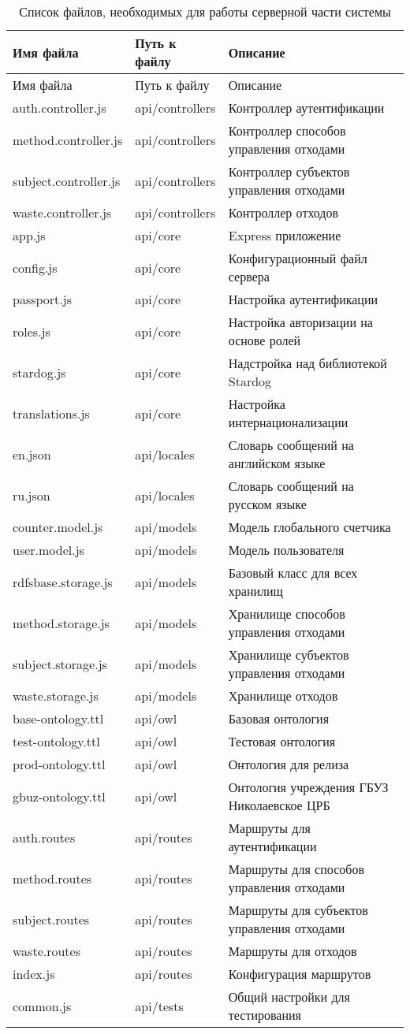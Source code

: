\documentclass[a4paper]{G2-105}
\begin{document}
\begin{longtable}[l]{|p{5cm}|p{3cm}|p{6.7cm}|}
\caption{Список файлов, необходимых для работы серверной части системы}
\label{tab:source_files_server}\tabularnewline
\hline
Имя файла & Путь к файлу & Описание \tabularnewline
\endfirsthead
\hline
Имя файла & Путь к файлу & Описание \tabularnewline
\endhead
\hline
auth.controller.js & api/controllers & Контроллер аутентификации \tabularnewline
\hline
method.controller.js & api/controllers & Контроллер способов управления отходами \tabularnewline
\hline
subject.controller.js & api/controllers & Контроллер субъектов управления отходами \tabularnewline
\hline
waste.controller.js & api/controllers & Контроллер отходов \tabularnewline
\hline
app.js & api/core & Express приложение \tabularnewline
\hline
config.js & api/core & Конфигурационный файл сервера \tabularnewline
\hline
passport.js & api/core & Настройка аутентификации \tabularnewline
\hline
roles.js & api/core & Настройка авторизации на основе ролей \tabularnewline
\hline
stardog.js & api/core & Надстройка над библиотекой Stardog \tabularnewline
\hline
translations.js & api/core & Настройка интернационализации \tabularnewline
\hline
en.json & api/locales & Словарь сообщений на английском языке \tabularnewline
\hline
ru.json & api/locales & Словарь сообщений на русском языке \tabularnewline
\hline
counter.model.js & api/models & Модель глобального счетчика \tabularnewline
\hline
user.model.js & api/models & Модель пользователя \tabularnewline
\hline
rdfsbase.storage.js & api/models & Базовый класс для всех хранилищ \tabularnewline
\hline
method.storage.js & api/models & Хранилище способов управления отходами \tabularnewline
\hline
subject.storage.js & api/models & Хранилище субъектов управления отходами \tabularnewline
\hline
waste.storage.js & api/models & Хранилище отходов \tabularnewline
\hline
base-ontology.ttl & api/owl & Базовая онтология \tabularnewline
\hline
test-ontology.ttl & api/owl & Тестовая онтология \tabularnewline
\hline
prod-ontology.ttl & api/owl & Онтология для релиза \tabularnewline
\hline
gbuz-ontology.ttl & api/owl & Онтология учреждения ГБУЗ Николаевское ЦРБ \tabularnewline
\hline
auth.routes & api/routes & Маршруты для аутентификации \tabularnewline
\hline
method.routes & api/routes & Маршруты для способов управления отходами \tabularnewline
\hline
subject.routes & api/routes & Маршруты для субъектов управления отходами \tabularnewline
\hline
waste.routes & api/routes & Маршруты для отходов \tabularnewline
\hline
index.js & api/routes & Конфигурация маршрутов \tabularnewline
\hline
common.js & api/tests & Общий настройки для тестирования \tabularnewline

\end{longtable}
\end{document}
